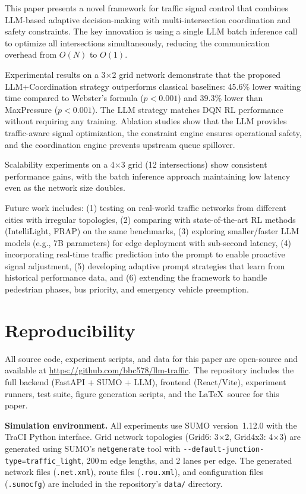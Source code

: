 \documentclass[conference]{IEEEtran}
\begin{document}
This paper presents a novel framework for traffic signal control that combines LLM-based adaptive decision-making with multi-intersection coordination and safety constraints. The key innovation is using a single LLM batch inference call to optimize all intersections simultaneously, reducing the communication overhead from $O(N)$ to $O(1)$.

Experimental results on a 3$\times$2 grid network demonstrate that the proposed LLM+Coordination strategy outperforms classical baselines: 45.6\% lower waiting time compared to Webster's formula ($p<0.001$) and 39.3\% lower than MaxPressure ($p<0.001$). The LLM strategy matches DQN RL performance without requiring any training. Ablation studies show that the LLM provides traffic-aware signal optimization, the constraint engine ensures operational safety, and the coordination engine prevents upstream queue spillover.

Scalability experiments on a 4$\times$3 grid (12 intersections) show consistent performance gains, with the batch inference approach maintaining low latency even as the network size doubles.

Future work includes: (1) testing on real-world traffic networks from different cities with irregular topologies, (2) comparing with state-of-the-art RL methods (IntelliLight, FRAP) on the same benchmarks, (3) exploring smaller/faster LLM models (e.g., 7B parameters) for edge deployment with sub-second latency, (4) incorporating real-time traffic prediction into the prompt to enable proactive signal adjustment, (5) developing adaptive prompt strategies that learn from historical performance data, and (6) extending the framework to handle pedestrian phases, bus priority, and emergency vehicle preemption.


\section{Reproducibility}
\label{sec:reproducibility}

All source code, experiment scripts, and data for this paper are open-source and available at \url{https://github.com/bbc578/llm-traffic}. The repository includes the full backend (FastAPI + SUMO + LLM), frontend (React/Vite), experiment runners, test suite, figure generation scripts, and the \LaTeX\ source for this paper.

\textbf{Simulation environment.} All experiments use SUMO version~1.12.0 with the TraCI Python interface. Grid network topologies (Grid6: 3$\times$2, Grid4x3: 4$\times$3) are generated using SUMO's \texttt{netgenerate} tool with \texttt{-{}-default-junction-type=traffic\_light}, 200\,m edge lengths, and 2 lanes per edge. The generated network files (\texttt{.net.xml}), route files (\texttt{.rou.xml}), and configuration files (\texttt{.sumocfg}) are included in the repository's \texttt{data/} directory.
\end{document}
